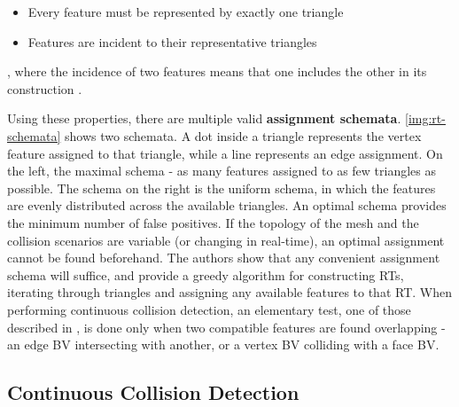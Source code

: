 \begin{itemize}
	\item Every feature must be represented by exactly one triangle
	\item Features are incident to their representative triangles
\end{itemize}

, where the incidence of two features means that one includes the other in its construction \citep{curtis2008}. 


Using these properties, there are multiple valid \textbf{assignment schemata}. \autoref{img:rt-schemata} shows two schemata. A dot inside a triangle represents the vertex feature assigned to that triangle, while a line represents an edge assignment. On the left, the maximal schema - as many features assigned to as few triangles as possible. The schema on the right is the uniform schema, in which the features are evenly distributed across the available triangles. An optimal schema provides the minimum number of false positives. If the topology of the mesh and the collision scenarios are variable (or changing in real-time), an optimal assignment cannot be found beforehand. The authors show that any convenient assignment schema will suffice, and provide a greedy algorithm for constructing RTs, iterating through triangles and assigning any available features to that RT. When performing continuous collision detection, an elementary test, one of those described in \citep{provot97}, is done only when two compatible features are found overlapping - an edge BV intersecting with another, or a vertex BV colliding with a face BV.


\FloatBarrier
\subsection{Continuous Collision Detection}
\label{sub-sec:ccd}

